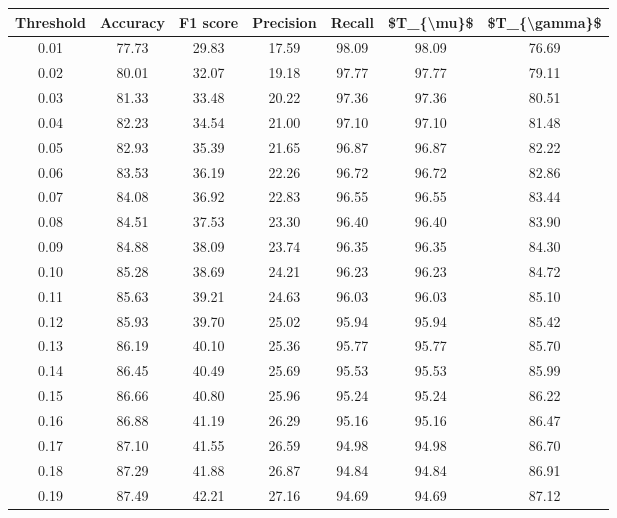 \begin{tabular}{|c|c|c|c|c|c|c|}
\hline
 Threshold &  Accuracy &  F1 score &  Precision &  Recall &  \$T\_\{\textbackslash mu\}\$ &  \$T\_\{\textbackslash gamma\}\$ \\
\hline
      0.01 &     77.73 &     29.83 &      17.59 &   98.09 &      98.09 &         76.69 \\
      0.02 &     80.01 &     32.07 &      19.18 &   97.77 &      97.77 &         79.11 \\
      0.03 &     81.33 &     33.48 &      20.22 &   97.36 &      97.36 &         80.51 \\
      0.04 &     82.23 &     34.54 &      21.00 &   97.10 &      97.10 &         81.48 \\
      0.05 &     82.93 &     35.39 &      21.65 &   96.87 &      96.87 &         82.22 \\
      0.06 &     83.53 &     36.19 &      22.26 &   96.72 &      96.72 &         82.86 \\
      0.07 &     84.08 &     36.92 &      22.83 &   96.55 &      96.55 &         83.44 \\
      0.08 &     84.51 &     37.53 &      23.30 &   96.40 &      96.40 &         83.90 \\
      0.09 &     84.88 &     38.09 &      23.74 &   96.35 &      96.35 &         84.30 \\
      0.10 &     85.28 &     38.69 &      24.21 &   96.23 &      96.23 &         84.72 \\
      0.11 &     85.63 &     39.21 &      24.63 &   96.03 &      96.03 &         85.10 \\
      0.12 &     85.93 &     39.70 &      25.02 &   95.94 &      95.94 &         85.42 \\
      0.13 &     86.19 &     40.10 &      25.36 &   95.77 &      95.77 &         85.70 \\
      0.14 &     86.45 &     40.49 &      25.69 &   95.53 &      95.53 &         85.99 \\
      0.15 &     86.66 &     40.80 &      25.96 &   95.24 &      95.24 &         86.22 \\
      0.16 &     86.88 &     41.19 &      26.29 &   95.16 &      95.16 &         86.47 \\
      0.17 &     87.10 &     41.55 &      26.59 &   94.98 &      94.98 &         86.70 \\
      0.18 &     87.29 &     41.88 &      26.87 &   94.84 &      94.84 &         86.91 \\
      0.19 &     87.49 &     42.21 &      27.16 &   94.69 &      94.69 &         87.12 \\

\end{tabular}
